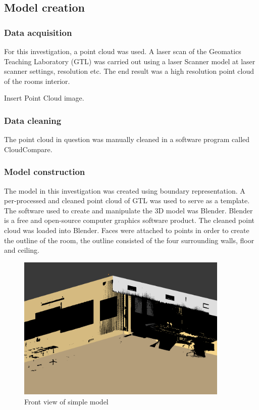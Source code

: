 \documentclass[11pt,a4paper]{report}
\begin{document}
		\subsection{Model creation}
			\subsubsection{Data acquisition}
				For this investigation, a point cloud was used. A laser scan of the Geomatics Teaching Laboratory (GTL) was carried out using a {{laser Scanner model}} at {{laser scanner settings, resolution etc}}. The end result was a high resolution point cloud of the rooms interior. 
				
				{{Insert Point Cloud image}}.
				
			\subsubsection{Data cleaning}
				The point cloud in question was manually cleaned in a software program called CloudCompare.
			
			\subsubsection{Model construction}
				The model in this investigation was created using boundary representation. A per-processed and cleaned point cloud of GTL was used to serve as a template. The software used to create and manipulate the 3D model was Blender. Blender is a free and open-source computer graphics software product. The cleaned point cloud was loaded into Blender. Faces were attached to points in order to create the outline of the room, the outline consisted of the four surrounding walls, floor and ceiling.
				
				\begin{figure}[h!]
					\centering
					\includegraphics[width=0.9\textwidth]{simple_model_with_pc}
					\caption{Front view of simple model}
				\end{figure}
				
\end{document}

